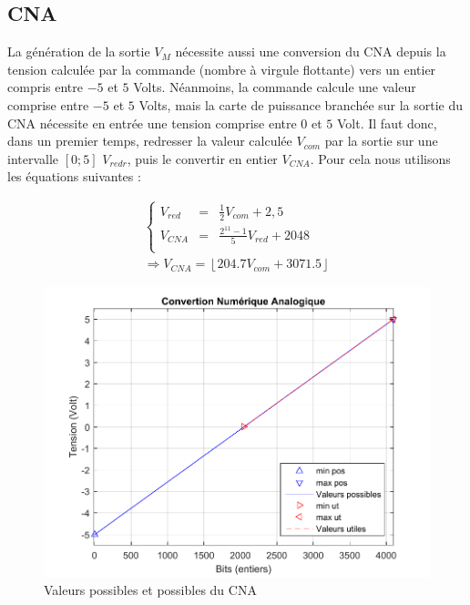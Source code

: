 \subsection{CNA}
La génération de la sortie $V_M$ nécessite aussi une conversion du CNA depuis la tension calculée par la commande (nombre à virgule flottante) vers un entier compris entre $-5$ et $5$ Volts. Néanmoins, la commande calcule une valeur comprise entre $-5$ et $5$ Volts, mais la carte de puissance branchée sur la sortie du CNA nécessite en entrée une tension comprise entre $0$ et $5$ Volt. Il faut donc, dans un premier temps, redresser la valeur calculée $V_{com}$ par la sortie sur une intervalle $\left[0;5\right]$ $V_{redr}$, puis le convertir en entier $V_{CNA}$. Pour cela nous utilisons les équations suivantes :

\begin{figure}[!ht]%
\begin{minipage}{.5\textwidth}%
\begin{equation}
\begin{array}{l}
\left\lbrace
\begin{array}{lcl}
V_{red}	&=&	\frac{1}{2}V_{com}+2,5\\
V_{CNA} &=& \frac{2^{11}-1}{5}V_{red}+2048\\
\end{array}
\right.\\
\Rightarrow V_{CNA} = \left\lfloor 204.7 V_{com} + 3071.5 \right\rfloor
\end{array}
\end{equation}	
\end{minipage}%
\hfill%
\begin{minipage}{.5\textwidth}%
\centering
\includegraphics[width=\textwidth]{./VI/images/CNA_plage.pdf}
\caption{\label{fig:CNA_p}Valeurs possibles et possibles du CNA}
\end{minipage}%
\end{figure}

